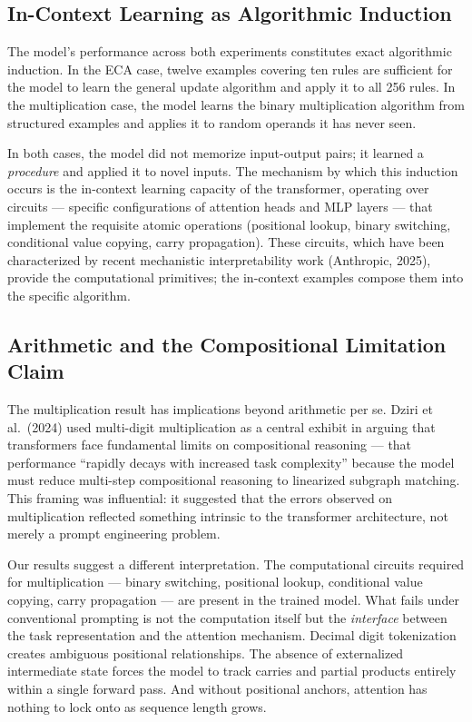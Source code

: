 \documentclass[twocolumn,switch,10pt]{article}
\begin{document}
\subsection{In-Context Learning as Algorithmic Induction}\label{in-context-learning-as-algorithmic-induction}

The model's performance across both experiments constitutes exact algorithmic induction. In the ECA case, twelve examples covering ten rules are sufficient for the model to learn the general update algorithm and apply it to all 256 rules. In the multiplication case, the model learns the binary multiplication algorithm from structured examples and applies it to random operands it has never seen.

In both cases, the model did not memorize input-output pairs; it learned a \emph{procedure} and applied it to novel inputs. The mechanism by which this induction occurs is the in-context learning capacity of the transformer, operating over circuits --- specific configurations of attention heads and MLP layers --- that implement the requisite atomic operations (positional lookup, binary switching, conditional value copying, carry propagation). These circuits, which have been characterized by recent mechanistic interpretability work (Anthropic, 2025), provide the computational primitives; the in-context examples compose them into the specific algorithm.

\subsection{Arithmetic and the Compositional Limitation Claim}\label{arithmetic-and-the-compositional-limitation-claim}

The multiplication result has implications beyond arithmetic per se. Dziri et al.~(2024) used multi-digit multiplication as a central exhibit in arguing that transformers face fundamental limits on compositional reasoning --- that performance ``rapidly decays with increased task complexity'' because the model must reduce multi-step compositional reasoning to linearized subgraph matching. This framing was influential: it suggested that the errors observed on multiplication reflected something intrinsic to the transformer architecture, not merely a prompt engineering problem.

Our results suggest a different interpretation. The computational circuits required for multiplication --- binary switching, positional lookup, conditional value copying, carry propagation --- are present in the trained model. What fails under conventional prompting is not the computation itself but the \emph{interface} between the task representation and the attention mechanism. Decimal digit tokenization creates ambiguous positional relationships. The absence of externalized intermediate state forces the model to track carries and partial products entirely within a single forward pass. And without positional anchors, attention has nothing to lock onto as sequence length grows.
\end{document}
